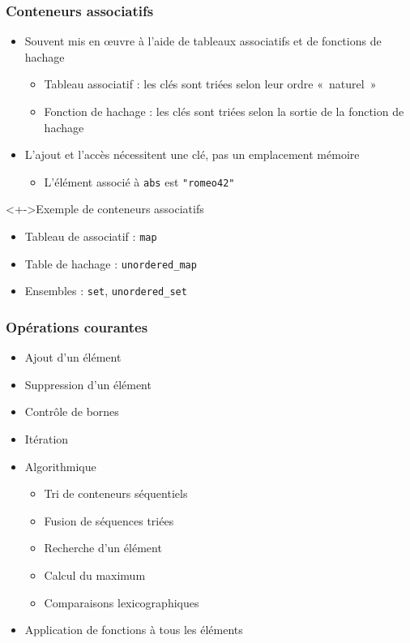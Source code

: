 \begin{frame}
\frametitle{Conteneurs associatifs}
\begin{itemize}[<+->]
\item Souvent mis en œuvre à l'aide de tableaux associatifs et de fonctions de hachage
	\begin{itemize}
	\item Tableau associatif : les clés sont triées selon leur ordre «~naturel~»
	\item Fonction de hachage : les clés sont triées selon la sortie de la fonction de hachage
	\end{itemize}
\item L'ajout et l'accès nécessitent une clé, pas un emplacement mémoire
	\begin{itemize}
	\item L'élément associé à \texttt{abs} est \lstinline|"romeo42"|
	\end{itemize}
\end{itemize}
\begin{exampleblock}<+->{Exemple de conteneurs associatifs}
	\begin{itemize}[<+->]
	\item Tableau de associatif : \texttt{map}
	\item Table de hachage : \texttt{unordered\_map}
	\item Ensembles : \texttt{set}, \texttt{unordered\_set}
	\end{itemize}
\end{exampleblock}
\end{frame}

\begin{frame}
\frametitle{Opérations courantes}
\begin{itemize}[<+->]
\item Ajout d'un élément
\item Suppression d'un élément
\item Contrôle de bornes
\item Itération
\item Algorithmique
	\begin{itemize}
	\item Tri de conteneurs séquentiels
	\item Fusion de séquences triées
	\item Recherche d'un élément
	\item Calcul du maximum
	\item Comparaisons lexicographiques
	\end{itemize}
\item Application de fonctions à tous les éléments
\end{itemize}
\end{frame}

